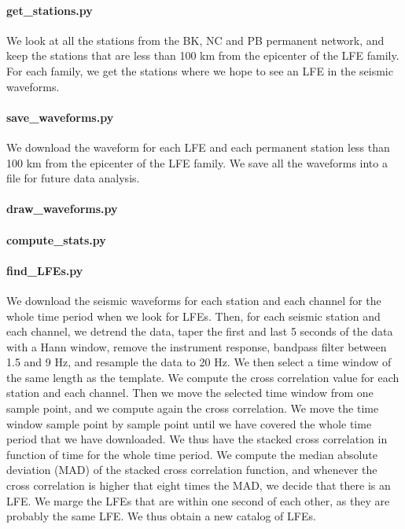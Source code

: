 \documentclass[workdone.tex]{subfiles}
\begin{document}
\paragraph{get\_stations.py} We look at all the stations from the BK, NC and PB permanent network, and keep the stations that are less than 100 km from the epicenter of the LFE family. For each family, we get the stations where we hope to see an LFE in the seismic waveforms.

\paragraph{save\_waveforms.py} We download the waveform for each LFE and each permanent station less than 100 km from the epicenter of the LFE family. We save all the waveforms into a file for future data analysis.

\paragraph{draw\_waveforms.py}

\paragraph{compute\_stats.py}

\paragraph{find\_LFEs.py} We download the seismic waveforms for each station and each channel for the whole time period when we look for LFEs. Then, for each seismic station and each channel, we detrend the data, taper the first and last 5 seconds of the data with a Hann window, remove the instrument response, bandpass filter between 1.5 and 9 Hz, and resample the data to 20 Hz. We then select a time window of the same length as the template. We compute the cross correlation value for each station and each channel. Then we move the selected time window from one sample point, and we compute again the cross correlation. We move the time window sample point by sample point until we have covered the whole time period that we have downloaded. We thus have the stacked cross correlation in function of time for the whole time period. We compute the median absolute deviation (MAD) of the stacked cross correlation function, and whenever the cross correlation is higher that eight times the MAD, we decide that there is an LFE. We marge the LFEs that are within one second of each other, as they are probably the same LFE. We thus obtain a new catalog of LFEs.
\end{document}
